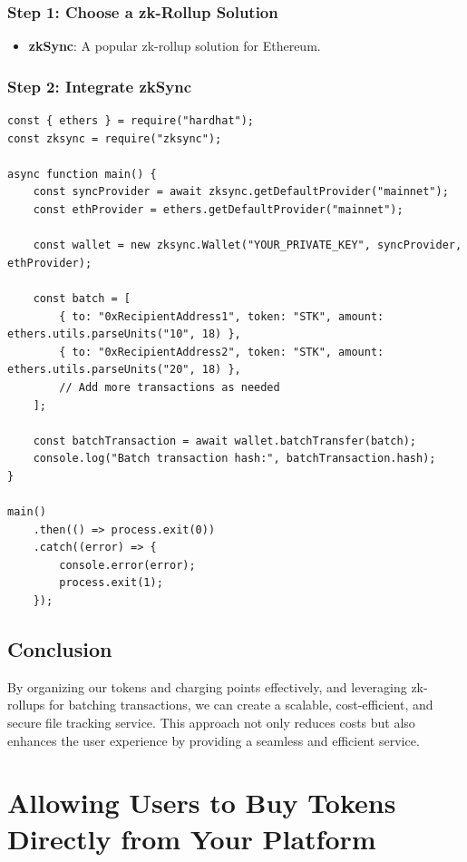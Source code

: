 \documentclass{tufte-handout}
\begin{document}
\subsubsection*{Step 1: Choose a zk-Rollup Solution}
\begin{itemize}
    \item \textbf{zkSync}: A popular zk-rollup solution for Ethereum.
\end{itemize}

\subsubsection*{Step 2: Integrate zkSync}

\begin{verbatim}
const { ethers } = require("hardhat");
const zksync = require("zksync");

async function main() {
    const syncProvider = await zksync.getDefaultProvider("mainnet");
    const ethProvider = ethers.getDefaultProvider("mainnet");

    const wallet = new zksync.Wallet("YOUR_PRIVATE_KEY", syncProvider, ethProvider);

    const batch = [
        { to: "0xRecipientAddress1", token: "STK", amount: ethers.utils.parseUnits("10", 18) },
        { to: "0xRecipientAddress2", token: "STK", amount: ethers.utils.parseUnits("20", 18) },
        // Add more transactions as needed
    ];

    const batchTransaction = await wallet.batchTransfer(batch);
    console.log("Batch transaction hash:", batchTransaction.hash);
}

main()
    .then(() => process.exit(0))
    .catch((error) => {
        console.error(error);
        process.exit(1);
    });
\end{verbatim}

\subsection*{Conclusion}

By organizing our tokens and charging points effectively, and leveraging zk-rollups for batching transactions, we can create a scalable, cost-efficient,
and secure file tracking service. This approach not only reduces costs but also enhances the user experience by providing a seamless and efficient service.

\section*{Allowing Users to Buy Tokens Directly from Your Platform}
\end{document}
